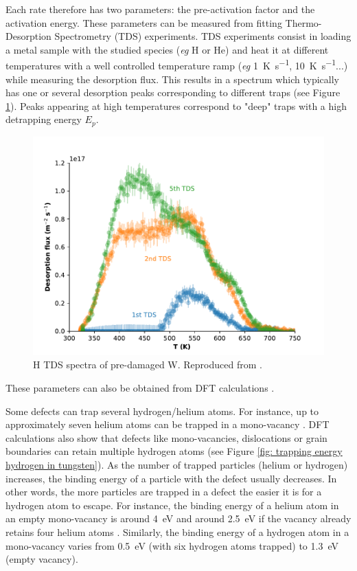 Each rate therefore has two parameters: the pre-activation factor and the activation energy.
These parameters can be measured from fitting Thermo-Desorption Spectrometry (TDS) experiments.
TDS experiments consist in loading a metal sample with the studied species (\textit{eg} H or He) and heat it at different temperatures with a well controlled temperature ramp (\textit{eg} \SI{1}{K.s^{-1}}, \SI{10}{K.s^{-1}}...) while measuring the desorption flux.
This results in a spectrum which typically has one or several desorption peaks corresponding to different traps (see Figure \ref{fig: TDS example ialovega}).
Peaks appearing at high temperatures correspond to "deep" traps with a high detrapping energy $E_p$.

\begin{figure} [h!]
    \centering
    \includegraphics[width=\linewidth]{Figures/Chapter1/tds_helium_nicolas.pdf}
    \caption{H TDS spectra of pre-damaged W. Reproduced from \cite{ialovega_hydrogen_2020}.}
    \label{fig: TDS example ialovega}
\end{figure}

These parameters can also be obtained from DFT calculations .

Some defects can trap several hydrogen/helium atoms.
For instance, up to approximately seven helium atoms can be trapped in a mono-vacancy .
DFT calculations also show that defects like mono-vacancies, dislocations or grain boundaries can retain multiple hydrogen atoms (see Figure \ref{fig: trapping energy hydrogen in tungsten}).
As the number of trapped particles (helium or hydrogen) increases, the binding energy of a particle with the defect usually decreases.
In other words, the more particles are trapped in a defect the easier it is for a hydrogen atom to escape.
For instance, the binding energy of a helium atom in an empty mono-vacancy is around \SI{4}{eV} and around \SI{2.5}{eV} if the vacancy already retains four helium atoms \cite{faney_spatially_2015}.
Similarly, the binding energy of a hydrogen atom in a mono-vacancy varies from \SI{0.5}{eV} (with six hydrogen atoms trapped) to \SI{1.3}{eV} (empty vacancy).

